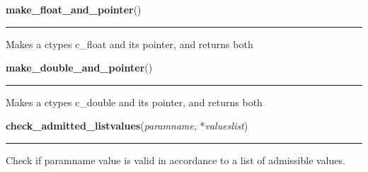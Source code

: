     \label{xformslib:library:make_float_and_pointer}

    \vspace{0.5ex}

\hspace{.8\funcindent}\begin{boxedminipage}{\funcwidth}

    \raggedright \textbf{make\_float\_and\_pointer}()

    \vspace{-1.5ex}

    \rule{\textwidth}{0.5\fboxrule}
\setlength{\parskip}{2ex}
    Makes a ctypes c\_float and its pointer, and returns both

\setlength{\parskip}{1ex}
    \end{boxedminipage}

    \label{xformslib:library:make_double_and_pointer}

    \vspace{0.5ex}

\hspace{.8\funcindent}\begin{boxedminipage}{\funcwidth}

    \raggedright \textbf{make\_double\_and\_pointer}()

    \vspace{-1.5ex}

    \rule{\textwidth}{0.5\fboxrule}
\setlength{\parskip}{2ex}
    Makes a ctypes c\_double and its pointer, and returns both

\setlength{\parskip}{1ex}
    \end{boxedminipage}

    \label{xformslib:library:check_admitted_listvalues}

    \vspace{0.5ex}

\hspace{.8\funcindent}\begin{boxedminipage}{\funcwidth}

    \raggedright \textbf{check\_admitted\_listvalues}(\textit{paramname}, *\textit{valueslist})

    \vspace{-1.5ex}

    \rule{\textwidth}{0.5\fboxrule}
\setlength{\parskip}{2ex}
    Check if paramname value is valid in accordance to a list of admissible
    values.

\setlength{\parskip}{1ex}
    \end{boxedminipage}

